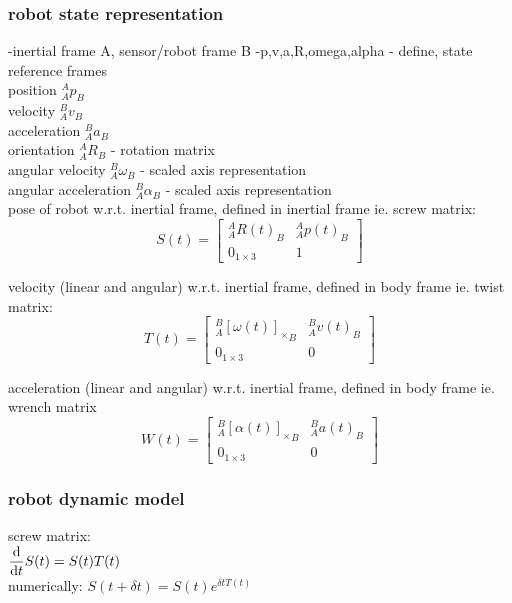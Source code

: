 	\subsubsection{robot state representation}
		-inertial frame A, sensor/robot frame  B
		-p,v,a,R,omega,alpha - define, state reference frames\\	
		position $^{A}_{A}p^{}_{B}$\\
		velocity $^{B}_{A}v^{}_{B}$\\
		acceleration $^{B}_{A}a^{}_{B}$\\
		orientation $^{A}_{A}R^{}_{B}$ - rotation matrix\\
		angular velocity $^{B}_{A}\omega^{}_{B}$ - scaled axis representation\\
		angular acceleration $^{B}_{A}\alpha^{}_{B}$ - scaled axis representation\\
		
		pose of robot w.r.t. inertial frame, defined in inertial frame ie. screw matrix:
		\begin{equation}
				S(t) = 
				\begin{bmatrix}
						  ^{A}_{A}R(t)^{}_{B} 	& 	^{A}_{A}p(t)^{}_{B}\\
						  0_{1\times3} & 1						  
				\end{bmatrix}
		\end{equation}
		
		velocity (linear and angular) w.r.t. inertial frame, defined in body frame ie. twist matrix:
		\begin{equation}
				T(t) = 
				\begin{bmatrix}
		  ^{B}_{A}{[\omega(t)]_\times}^{}_{B} 	& 	^{B}_{A}v(t)^{}_{B}\\
		  0_{1\times3} & 0						  
				\end{bmatrix}
		\end{equation}
				
		acceleration (linear and angular) w.r.t. inertial frame, defined in body frame ie. wrench matrix
		\begin{equation}
				W(t) = 
				\begin{bmatrix}
				  ^{B}_{A}{[\alpha(t)]_\times}^{}_{B} 	& 	^{B}_{A}a(t)^{}_{B}\\
				  0_{1\times3} & 0						  
				\end{bmatrix}
		\end{equation}
		
				
	\subsubsection{robot dynamic model}
		screw matrix:\\
		$ \dfrac{\textnormal{d}}{\textnormal{d}t}S(t)=S(t)T(t)$\\
		numerically: $S(t+\delta t) = S(t)e^{\delta tT(t)}$
		
